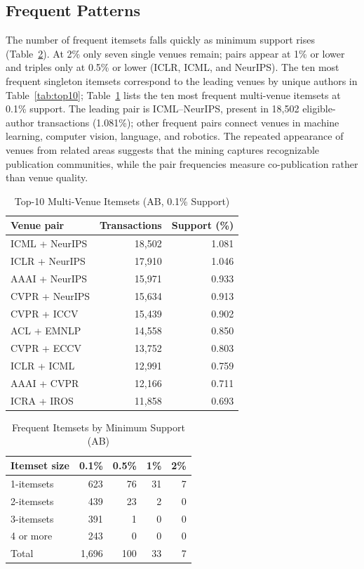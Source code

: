 \documentclass[conference]{IEEEtran}
\begin{document}
\subsection{Frequent Patterns}
The number of frequent itemsets falls quickly as minimum support rises (Table~\ref{tab:itemsets}). At 2\% only seven single venues remain; pairs appear at 1\% or lower and triples only at 0.5\% or lower (ICLR, ICML, and NeurIPS). The ten most frequent singleton itemsets correspond to the leading venues by unique authors in Table~\ref{tab:top10}; Table~\ref{tab:pairs} lists the ten most frequent multi-venue itemsets at 0.1\% support. The leading pair is ICML--NeurIPS, present in 18,502 eligible-author transactions (1.081\%); other frequent pairs connect venues in machine learning, computer vision, language, and robotics. The repeated appearance of venues from related areas suggests that the mining captures recognizable publication communities, while the pair frequencies measure co-publication rather than venue quality.

\begin{table}[t]
\caption{Top-10 Multi-Venue Itemsets (AB, 0.1\% Support)}
\label{tab:pairs}
\centering
\footnotesize
\begin{tabular}{lrr}
\toprule
Venue pair & Transactions & Support (\%) \\
\midrule
ICML + NeurIPS & 18,502 & 1.081 \\
ICLR + NeurIPS & 17,910 & 1.046 \\
AAAI + NeurIPS & 15,971 & 0.933 \\
CVPR + NeurIPS & 15,634 & 0.913 \\
CVPR + ICCV & 15,439 & 0.902 \\
ACL + EMNLP & 14,558 & 0.850 \\
CVPR + ECCV & 13,752 & 0.803 \\
ICLR + ICML & 12,991 & 0.759 \\
AAAI + CVPR & 12,166 & 0.711 \\
ICRA + IROS & 11,858 & 0.693 \\
\bottomrule
\end{tabular}
\end{table}

\begin{table}[t]
\caption{Frequent Itemsets by Minimum Support (AB)}
\label{tab:itemsets}
\centering
\footnotesize
\begin{tabular}{lrrrr}
\toprule
Itemset size & 0.1\% & 0.5\% & 1\% & 2\% \\
\midrule
1-itemsets & 623 & 76 & 31 & 7 \\
2-itemsets & 439 & 23 & 2 & 0 \\
3-itemsets & 391 & 1 & 0 & 0 \\
4 or more & 243 & 0 & 0 & 0 \\
Total & 1,696 & 100 & 33 & 7 \\
\bottomrule
\end{tabular}
\end{table}
\end{document}
